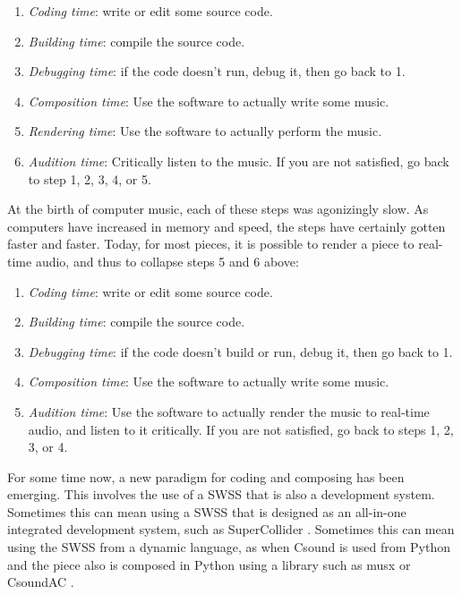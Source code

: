 \documentclass[letterpaper, 12pt]{article}
\begin{document}
\begin{enumerate}
\item \textit{Coding time}: write or edit some source code.
\item \textit{Building time}: compile the source code.
\item \textit{Debugging time}: if the code doesn't run, debug it, then go back to 1.
\item \textit{Composition time}: Use the software to actually write some music.
\item \textit{Rendering time}: Use the software to actually perform the music.
\item \textit{Audition time}: Critically listen to the music. If you are not satisfied, go back to step 1, 2, 3, 4, or 5.
\end{enumerate}

\noindent At the birth of computer music, each of these steps was agonizingly slow. As computers have increased in memory and speed, the steps have certainly gotten faster and faster. Today, for most pieces, it is possible to render a piece to real-time audio, and thus to collapse steps 5 and 6 above:

\begin{enumerate}
\item \textit{Coding time}: write or edit some source code.
\item \textit{Building time}: compile the source code.
\item \textit{Debugging time}: if the code doesn't build or run, debug it, then go back to 1.
\item \textit{Composition time}: Use the software to actually write some music.
\item \textit{Audition time}: Use the software to actually render the music to real-time audio, and listen to it critically. If you are not satisfied, go back to steps 1, 2, 3, or 4.
\end{enumerate}

For some time now, a new paradigm for coding and composing has been emerging. This involves the use of a SWSS that is also a development system. Sometimes this can mean using a SWSS that is designed as an all-in-one integrated development system, such as SuperCollider \citep{supercollider, mccartney2002rethinking}. Sometimes this can mean using the SWSS from a dynamic language, as when Csound \citep{csoundmain, lazzarini2016csound, csoundbook} is used from Python \citep{python} and the piece also is composed in Python using a library such as musx \citep{musx} or CsoundAC \citep{csoundextended}.
\end{document}
